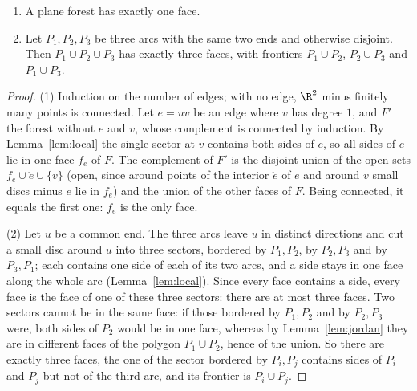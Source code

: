 \begin{lemma}\label{lem:theta}
\begin{enumerate}
\item A plane forest has exactly one face.
\item Let $P_1,P_2,P_3$ be three arcs with the same two ends and otherwise disjoint. Then $P_1\cup P_2\cup P_3$ has exactly three faces, with frontiers
$P_1\cup P_2$, $P_2\cup P_3$ and $P_1\cup P_3$.
\end{enumerate}
\end{lemma}
\begin{proof}
(1) Induction on the number of edges; with no edge, $\R^2$ minus finitely many points is connected. Let $e=uv$ be an edge where $v$ has degree $1$, and $F'$ the
forest without $e$ and $v$, whose complement is connected by induction. By Lemma~\ref{lem:local} the single sector at $v$ contains both sides of $e$, so all
sides of $e$ lie in one face $f_e$ of $F$. The complement of $F'$ is the disjoint union of the open sets $f_e\cup\mathring e\cup\{v\}$ (open, since around points of the
interior $\mathring e$ of $e$ and around $v$ small discs minus $e$ lie in $f_e$) and the union of the other faces of $F$. Being connected, it equals the first one: $f_e$ is the
only face.

(2) Let $u$ be a common end. The three arcs leave $u$ in distinct directions and cut a small disc around $u$ into three sectors, bordered by
$P_1,P_2$, by $P_2,P_3$ and by $P_3,P_1$; each contains one side of each of its two arcs, and a side stays in one face along the whole arc
(Lemma~\ref{lem:local}). Since every face contains a side, every face is the face of one of these three sectors: there are at most three faces.
Two sectors cannot be in the same face: if those bordered by $P_1,P_2$ and by $P_2,P_3$ were, both sides of $P_2$ would be in one face, whereas by
Lemma~\ref{lem:jordan} they are in different faces of the polygon $P_1\cup P_2$, hence of the union. So there are exactly three faces, the one of the sector
bordered by $P_i,P_j$ contains sides of $P_i$ and $P_j$ but not of the third arc, and its frontier is $P_i\cup P_j$.
\end{proof}

